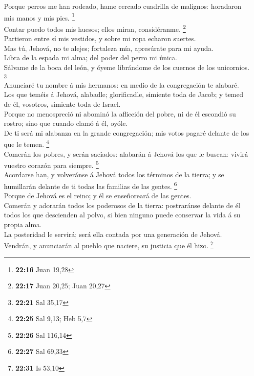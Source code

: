  Porque perros me han rodeado, hame cercado cuadrilla de
malignos: horadaron mis manos y mis pies. \footnote{\textbf{22:16} Juan
  19,28}\\
 Contar puedo todos mis huesos; ellos miran,
considéranme. \footnote{\textbf{22:17} Juan 20,25; Juan 20,27}\\
 Partieron entre sí mis vestidos, y sobre mi ropa echaron
suertes.\\
 Mas tú, Jehová, no te alejes; fortaleza mía, apresúrate
para mi ayuda.\\
 Libra de la espada mi alma; del poder del perro mi
única.\\
 Sálvame de la boca del león, y óyeme librándome de los
cuernos de los unicornios. \footnote{\textbf{22:21} Sal 35,17}\\
 Anunciaré tu nombre á mis hermanos: en medio de la
congregación te alabaré.\\
 Los que teméis á Jehová, alabadle; glorificadle,
simiente toda de Jacob; y temed de él, vosotros, simiente toda de
Israel.\\
 Porque no menospreció ni abominó la aflicción del pobre,
ni de él escondió su rostro; sino que cuando clamó á él, oyóle.\\
 De ti será mi alabanza en la grande congregación; mis
votos pagaré delante de los que le temen. \footnote{\textbf{22:25} Sal
  9,13; Heb 5,7}\\
 Comerán los pobres, y serán saciados: alabarán á Jehová
los que le buscan: vivirá vuestro corazón para siempre. \footnote{\textbf{22:26}
  Sal 116,14}\\
 Acordarse han, y volveránse á Jehová todos los términos
de la tierra; y se humillarán delante de ti todas las familias de las
gentes. \footnote{\textbf{22:27} Sal 69,33}\\
 Porque de Jehová es el reino; y él se enseñoreará de las
gentes.\\
 Comerán y adorarán todos los poderosos de la tierra:
postraránse delante de él todos los que descienden al polvo, si bien
ninguno puede conservar la vida á su propia alma.\\
 La posteridad le servirá; será ella contada por una
generación de Jehová.\\
 Vendrán, y anunciarán al pueblo que naciere, su justicia
que él hizo. \footnote{\textbf{22:31} Is 53,10}

